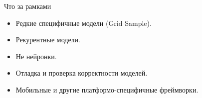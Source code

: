 \documentclass[mathserif,serif,unicode]{beamer}
\begin{document}
\begin{frame}{Что за рамками}

\begin{itemize}
    \item Редкие специфичные модели (Grid Sample).
    \item Рекурентные модели.
    \item Не нейронки.
    \item Отладка и проверка корректности моделей.
    \item Мобильные и другие платформо-специфичные фреймворки.
\end{itemize}
    
\end{frame}
\end{document}
